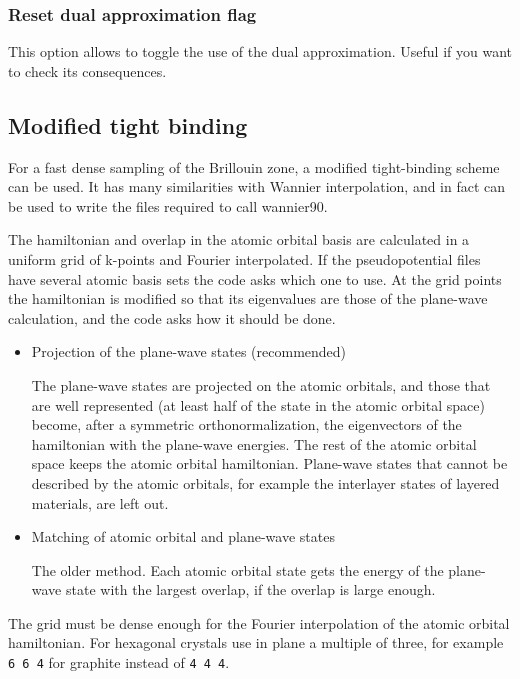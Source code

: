 \documentclass[11pt]{article}
\begin{document}
\subsubsection{Reset dual approximation flag}

This option allows to toggle the use of the dual approximation.
Useful if you want to check its consequences.



\subsection{Modified tight binding}

For a fast dense sampling of the Brillouin zone, a modified tight-binding scheme
can be used.  It has many similarities with Wannier interpolation, and in fact
can be used to write the files required to call {\sc wannier90}.

The hamiltonian and overlap in the atomic orbital basis are calculated in a uniform
grid of k-points and Fourier interpolated.  If the pseudopotential files have several
atomic basis sets the code asks which one to use.  At the grid points the hamiltonian is
modified so that its eigenvalues are those of the plane-wave calculation, and the code
asks how it should be done.
\begin{itemize}
   \item{Projection of the plane-wave states (recommended)}

   The plane-wave states are projected on the atomic orbitals, and those that are well
   represented (at least half of the state in the atomic orbital space) become, after a
   symmetric orthonormalization, the eigenvectors of the hamiltonian with the plane-wave
   energies.  The rest of the atomic orbital space keeps the atomic orbital hamiltonian.
   Plane-wave states that cannot be described by the atomic orbitals, for example the
   interlayer states of layered materials, are left out.

   \item{Matching of atomic orbital and plane-wave states}

   The older method.  Each atomic orbital state gets the energy of the plane-wave state
   with the largest overlap, if the overlap is large enough.
\end{itemize}
The grid must be dense enough for the Fourier interpolation of the atomic orbital
hamiltonian.  For hexagonal crystals use in plane a multiple of three, for example
\texttt{6 6 4} for graphite instead of \texttt{4 4 4}.
\end{document}

